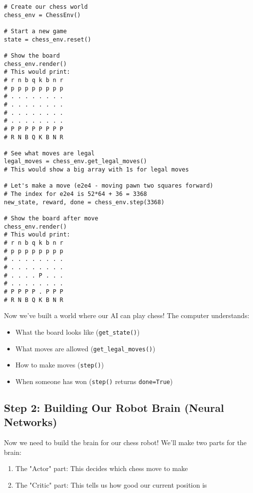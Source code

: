 \documentclass[11pt]{article}
\begin{document}
\begin{tcolorbox}[colback=yellow!5!white,colframe=yellow!75!black,title=Example: Setting Up and Making a Move]
\begin{lstlisting}[style=Python]
# Create our chess world
chess_env = ChessEnv()

# Start a new game
state = chess_env.reset()

# Show the board
chess_env.render()
# This would print:
# r n b q k b n r
# p p p p p p p p
# . . . . . . . .
# . . . . . . . .
# . . . . . . . .
# . . . . . . . .
# P P P P P P P P
# R N B Q K B N R

# See what moves are legal
legal_moves = chess_env.get_legal_moves()
# This would show a big array with 1s for legal moves

# Let's make a move (e2e4 - moving pawn two squares forward)
# The index for e2e4 is 52*64 + 36 = 3368
new_state, reward, done = chess_env.step(3368)

# Show the board after move
chess_env.render()
# This would print:
# r n b q k b n r
# p p p p p p p p
# . . . . . . . .
# . . . . . . . .
# . . . . P . . .
# . . . . . . . .
# P P P P . P P P
# R N B Q K B N R
\end{lstlisting}
\end{tcolorbox}

Now we've built a world where our AI can play chess! The computer understands:
\begin{itemize}
    \item What the board looks like (\texttt{get\_state()})
    \item What moves are allowed (\texttt{get\_legal\_moves()})
    \item How to make moves (\texttt{step()})
    \item When someone has won (\texttt{step()} returns \texttt{done=True})
\end{itemize}

\subsection{Step 2: Building Our Robot Brain (Neural Networks)}

Now we need to build the brain for our chess robot! We'll make two parts for the brain:
\begin{enumerate}
    \item The "Actor" part: This decides which chess move to make
    \item The "Critic" part: This tells us how good our current position is
\end{enumerate}
\end{document}
